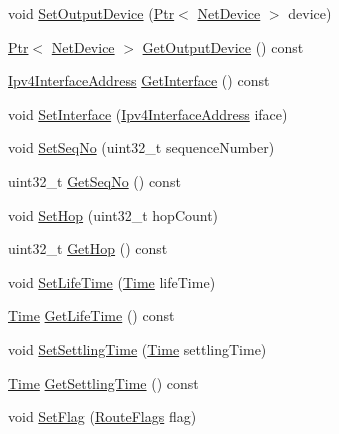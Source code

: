\begin{DoxyCompactItemize}
\item 
void \hyperlink{classns3_1_1dsdv_1_1RoutingTableEntry_a7d923727576bfd88cdf2810ae931b92c}{Set\+Output\+Device} (\hyperlink{classns3_1_1Ptr}{Ptr}$<$ \hyperlink{classns3_1_1NetDevice}{Net\+Device} $>$ device)
\item 
\hyperlink{classns3_1_1Ptr}{Ptr}$<$ \hyperlink{classns3_1_1NetDevice}{Net\+Device} $>$ \hyperlink{classns3_1_1dsdv_1_1RoutingTableEntry_ad1b80adf9b162d67dbbbc16ac50336b5}{Get\+Output\+Device} () const 
\item 
\hyperlink{classns3_1_1Ipv4InterfaceAddress}{Ipv4\+Interface\+Address} \hyperlink{classns3_1_1dsdv_1_1RoutingTableEntry_a96a71ac4efcc0c6bf7f6a914dd0698b6}{Get\+Interface} () const 
\item 
void \hyperlink{classns3_1_1dsdv_1_1RoutingTableEntry_ae669c5dc4a6a17b152f80a33c2359bfd}{Set\+Interface} (\hyperlink{classns3_1_1Ipv4InterfaceAddress}{Ipv4\+Interface\+Address} iface)
\item 
void \hyperlink{classns3_1_1dsdv_1_1RoutingTableEntry_af43b90a91dd7167d1b20e775cc0a833f}{Set\+Seq\+No} (uint32\+\_\+t sequence\+Number)
\item 
uint32\+\_\+t \hyperlink{classns3_1_1dsdv_1_1RoutingTableEntry_a3e4ebb98ad1e94b0806bbbfca5be8c62}{Get\+Seq\+No} () const 
\item 
void \hyperlink{classns3_1_1dsdv_1_1RoutingTableEntry_a04e509dbdfb0aed896c79af91f549d96}{Set\+Hop} (uint32\+\_\+t hop\+Count)
\item 
uint32\+\_\+t \hyperlink{classns3_1_1dsdv_1_1RoutingTableEntry_a1d8272990e7a4e9f18ded6fa067c17d3}{Get\+Hop} () const 
\item 
void \hyperlink{classns3_1_1dsdv_1_1RoutingTableEntry_a1b5b026d6104af8edf4623c7e7b139e8}{Set\+Life\+Time} (\hyperlink{classns3_1_1Time}{Time} life\+Time)
\item 
\hyperlink{classns3_1_1Time}{Time} \hyperlink{classns3_1_1dsdv_1_1RoutingTableEntry_a0053dda05f804f6996740983d7f88c1c}{Get\+Life\+Time} () const 
\item 
void \hyperlink{classns3_1_1dsdv_1_1RoutingTableEntry_a64bc3c9bd6548e38938bcf349085d9d4}{Set\+Settling\+Time} (\hyperlink{classns3_1_1Time}{Time} settling\+Time)
\item 
\hyperlink{classns3_1_1Time}{Time} \hyperlink{classns3_1_1dsdv_1_1RoutingTableEntry_a9c26e4516fd84e5f6f5c6c9e7a1b8dba}{Get\+Settling\+Time} () const 
\item 
void \hyperlink{classns3_1_1dsdv_1_1RoutingTableEntry_ad928b4811bfa2793179db897ebb8293f}{Set\+Flag} (\hyperlink{namespacens3_1_1dsdv_aa1c39555b993cc6f56f2c8c6c31e2c3b}{Route\+Flags} flag)

\end{DoxyCompactItemize}
